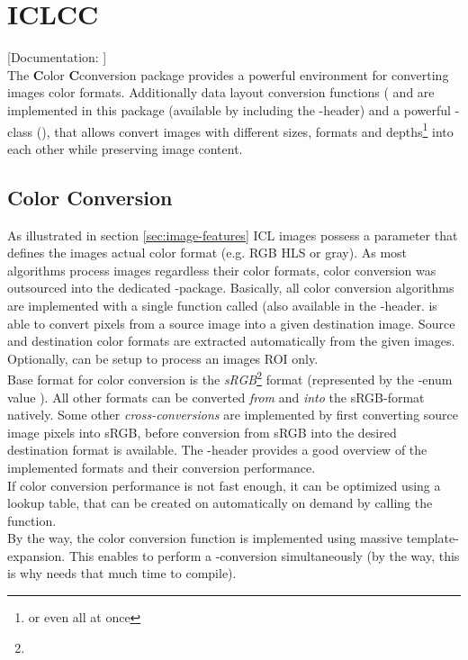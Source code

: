 \section{ICLCC\label{sec:cc}}

[Documentation: ]\\
The \textbf{C}olor \textbf{C}conversion package provides a powerful environment for converting images color formats. Additionally data layout conversion functions ( and  are implemented in this package (available by including the -header) and a powerful -class (), that allows convert images with different sizes, formats and depths\footnote{or even all at once} into each other while preserving image content.


\subsection{Color Conversion}

As illustrated in section \ref{sec:image-features} ICL images possess a  parameter that defines the images actual color format (e.g. RGB HLS or gray). As most algorithms process images regardless their color formats, color conversion was outsourced into the dedicated -package. Basically, all color conversion algorithms are implemented with a single function called  (also available in the -header.  is able to convert pixels from a source image into a given destination image. Source and destination color formats are extracted automatically from the given images. Optionally,  can be setup to process an images ROI only.\\
Base format for color conversion is the \emph{sRGB}\footnote{} format (represented by the -enum value ). All other formats can be converted \emph{from} and \emph{into} the sRGB-format natively. Some other \emph{cross-conversions} are implemented by first converting source image pixels into sRGB, before conversion from sRGB into the desired destination format is available. The -header provides a good overview of the implemented formats and their conversion performance.\\
If color conversion performance is not fast enough, it can be optimized using a lookup table, that can be created on automatically on demand by calling the  function.\\
By the way, the color conversion function  is implemented using massive template-expansion. This enables  to perform a -conversion simultaneously (by the way, this is why  needs that much time to compile).

